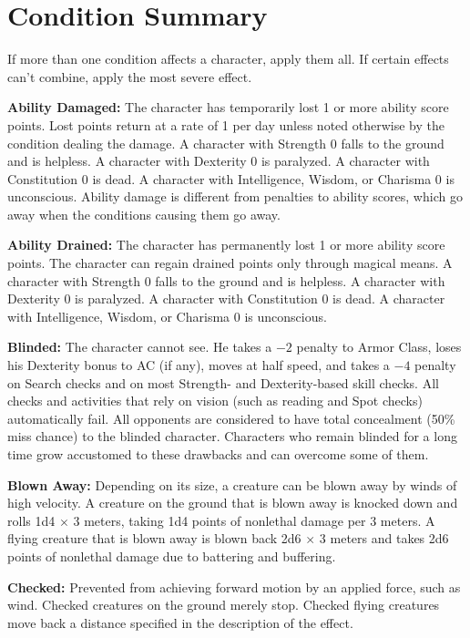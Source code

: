 \section{Condition Summary}
If more than one condition affects a character, apply them all. If certain effects can't combine, apply the most severe effect.

\textbf{Ability Damaged:} The character has temporarily lost 1 or more ability score points. Lost points return at a rate of 1 per day unless noted otherwise by the condition dealing the damage. A character with Strength 0 falls to the ground and is helpless. A character with Dexterity 0 is paralyzed. A character with Constitution 0 is dead. A character with Intelligence, Wisdom, or Charisma 0 is unconscious. Ability damage is different from penalties to ability scores, which go away when the conditions causing them go away.

\textbf{Ability Drained:} The character has permanently lost 1 or more ability score points. The character can regain drained points only through magical means. A character with Strength 0 falls to the ground and is helpless. A character with Dexterity 0 is paralyzed. A character with Constitution 0 is dead. A character with Intelligence, Wisdom, or Charisma 0 is unconscious.

\textbf{Blinded:} The character cannot see. He takes a $-2$ penalty to Armor Class, loses his Dexterity bonus to AC (if any), moves at half speed, and takes a $-4$ penalty on Search checks and on most Strength- and Dexterity-based skill checks. All checks and activities that rely on vision (such as reading and Spot checks) automatically fail. All opponents are considered to have total concealment (50\% miss chance) to the blinded character. Characters who remain blinded for a long time grow accustomed to these drawbacks and can overcome some of them.

\textbf{Blown Away:} Depending on its size, a creature can be blown away by winds of high velocity. A creature on the ground that is blown away is knocked down and rolls 1d4 $\times$ 3 meters, taking 1d4 points of nonlethal damage per 3 meters. A flying creature that is blown away is blown back 2d6 $\times$ 3 meters and takes 2d6 points of nonlethal damage due to battering and buffering.

\textbf{Checked:} Prevented from achieving forward motion by an applied force, such as wind. Checked creatures on the ground merely stop. Checked flying creatures move back a distance specified in the description of the effect.

